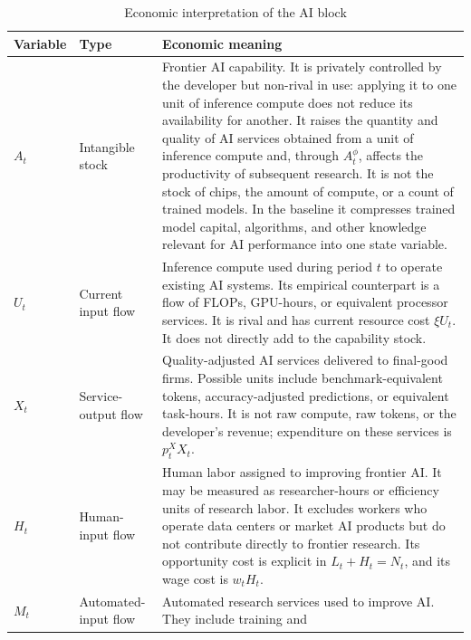 \begin{table}[H]
    \centering
    \caption{Economic interpretation of the AI block}
    \label{tab:ai-variable-interpretation}
    \small
    \begin{tabular}{p{}p{}p{}}
        \toprule
        Variable & Type & Economic meaning \\
        \midrule
        $A_t$
        & \raggedright Intangible stock
        & Frontier AI capability. It is privately controlled by the developer but
        non-rival in use: applying it to one unit of inference compute does not reduce
        its availability for another. It raises the quantity and quality of AI services
        obtained from a unit of inference compute and, through $A_t^\phi$, affects the
        productivity of subsequent research. It is not the stock of chips, the amount
        of compute, or a count of trained models. In the baseline it compresses trained
        model capital, algorithms, and other knowledge relevant for AI performance into
        one state variable. \\
        \addlinespace
        $U_t$
        & \raggedright Current input flow
        & Inference compute used during period $t$ to operate existing AI systems. Its
        empirical counterpart is a flow of FLOPs, GPU-hours, or equivalent processor
        services. It is rival and has current resource cost $\xi U_t$. It does not
        directly add to the capability stock. \\
        \addlinespace
        $X_t$
        & \raggedright Service-output flow
        & Quality-adjusted AI services delivered to final-good firms. Possible units
        include benchmark-equivalent tokens, accuracy-adjusted predictions, or
        equivalent task-hours. It is not raw compute, raw tokens, or the developer's
        revenue; expenditure on these services is $p^X_tX_t$. \\
        \addlinespace
        $H_t$
        & \raggedright Human-input flow
        & Human labor assigned to improving frontier AI. It may be measured as
        researcher-hours or efficiency units of research labor. It excludes workers
        who operate data centers or market AI products but do not contribute directly
        to frontier research. Its opportunity cost is explicit in $L_t+H_t=N_t$, and
        its wage cost is $w_tH_t$. \\
        \addlinespace
        $M_t$
        & \raggedright Automated-input flow
        & Automated research services used to improve AI. They include training and

\end{tabular}
\end{table}
